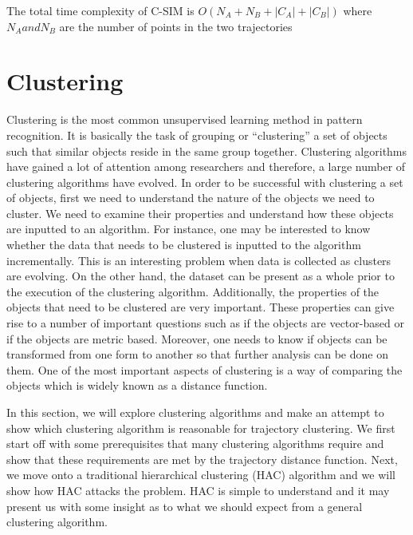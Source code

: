 \documentclass[a4paper, 12pt]{article}
\begin{document}
The total time complexity of C-SIM is $O(N_A + N_B + |C_A| + |C_B|)$ where $N_A and N_B$ are the number of points in the two trajectories

\section{Clustering}
Clustering is the most common unsupervised learning method in pattern recognition. It is basically the task of grouping or “clustering” a set of objects such that similar objects reside in the same group together. Clustering algorithms have gained a lot of attention among researchers and therefore, a large number of clustering algorithms have evolved. In order to be successful with clustering a set of objects, first we need to understand the nature of the objects we need to cluster. We need to examine their properties and understand how these objects are inputted to an algorithm. For instance, one may be interested to know whether the data that needs to be clustered is inputted to the algorithm incrementally. This is an interesting problem when data is collected as clusters are evolving. On the other hand, the dataset can be present as a whole prior to the execution of the clustering algorithm. Additionally, the properties of the objects that need to be clustered are very important. These properties can give rise to a number of important questions such as if the objects are vector-based or if the objects are metric based. Moreover, one needs to know if objects can be transformed from one form to another so that further analysis can be done on them. One of the most important aspects of clustering is a way of comparing the objects which is widely known as a distance function. 

In this section, we will explore clustering algorithms and make an attempt to show which clustering algorithm is reasonable for trajectory clustering. We first start off with some prerequisites that many clustering algorithms require and show that these requirements are met by the trajectory distance function. Next, we move onto a traditional hierarchical clustering (HAC) algorithm and we will show how HAC attacks the problem. HAC is simple to understand and it may present us with some insight as to what we should expect from a general clustering algorithm.
\end{document}

